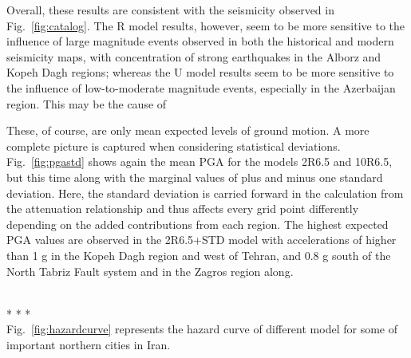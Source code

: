 Overall, these results are consistent with the seismicity observed in Fig.~\ref{fig:catalog}. The R model results, however, seem to be more sensitive to the influence of large magnitude events observed in both the historical and modern seismicity maps, with concentration of strong earthquakes in the Alborz and Kopeh Dagh regions; whereas the U model results seem to be more sensitive to the influence of low-to-moderate magnitude events, especially in the Azerbaijan region. This may be the cause of 

These, of course, are only mean expected levels of ground motion. A more complete picture is captured when considering statistical deviations. Fig.~\ref{fig:pgastd} shows again the mean PGA for the models 2R6.5 and 10R6.5, but this time along with the marginal values of plus and minus one standard deviation. Here, the standard deviation is carried forward in the calculation from the attenuation relationship and thus affects every grid point differently depending on the added contributions from each region. The highest expected PGA values are observed in the 2R6.5+STD model with accelerations of higher than 1 g in the Kopeh Dagh region and west of Tehran, and 0.8 g south of the North Tabriz Fault system and in the Zagros region along.

~\\
* * *
\\



Fig.~\ref{fig:hazardcurve} represents the hazard curve of different model for some of important northern cities in Iran. 

